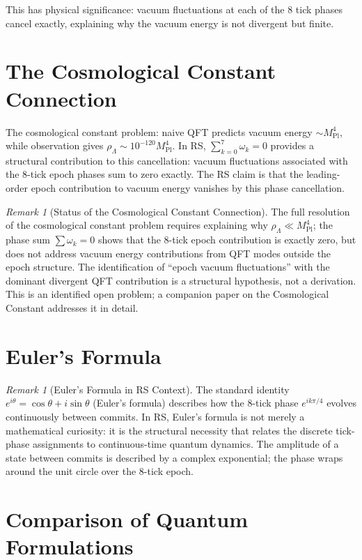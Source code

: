 \documentclass[12pt,a4paper]{article}
\theoremstyle{definition}
\theoremstyle{remark}
\newtheorem{remark}[theorem]{Remark}
\begin{document}
This has physical significance: vacuum fluctuations at each of the 8
tick phases cancel exactly, explaining why the vacuum energy is not
divergent but finite.

\section{The Cosmological Constant Connection}

The cosmological constant problem: naive QFT predicts vacuum energy
$\sim M_{\mathrm{Pl}}^4$, while observation gives $\rho_\Lambda \sim
10^{-120} M_{\mathrm{Pl}}^4$.  In RS, $\sum_{k=0}^7 \omega_k = 0$
provides a structural contribution to this cancellation: vacuum
fluctuations associated with the 8-tick epoch phases sum to zero
exactly.  The RS claim is that the leading-order epoch contribution to
vacuum energy vanishes by this phase cancellation.

\begin{remark}[Status of the Cosmological Constant Connection]
The full resolution of the cosmological constant problem requires
explaining why $\rho_\Lambda \ll M_{\mathrm{Pl}}^4$; the phase sum
$\sum \omega_k = 0$ shows that the 8-tick epoch contribution is exactly
zero, but does not address vacuum energy contributions from QFT modes
outside the epoch structure.  The identification of ``epoch vacuum
fluctuations'' with the dominant divergent QFT contribution is a
structural hypothesis, not a derivation.  This is an identified open
problem; a companion paper on the Cosmological Constant addresses it
in detail.
\end{remark}

\section{Euler's Formula}

\begin{remark}[Euler's Formula in RS Context]
The standard identity $e^{i\theta} = \cos\theta + i\sin\theta$
(Euler's formula) describes how the 8-tick phase $e^{ik\pi/4}$ evolves
continuously between commits.  In RS, Euler's formula is not merely a
mathematical curiosity: it is the structural necessity that relates the
discrete tick-phase assignments to continuous-time quantum dynamics.
The amplitude of a state between commits is described by a complex
exponential; the phase wraps around the unit circle over the 8-tick epoch.
\end{remark}

\section{Comparison of Quantum Formulations}
\end{document}
